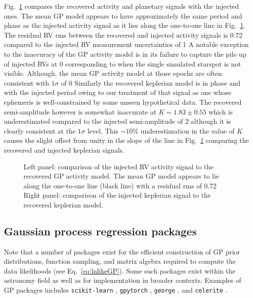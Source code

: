 Fig.~\ref{fig:RVcomp} compares the recovered activity and planetary signals with the injected
ones. The mean GP model appears to have approximately the same period and phase as the injected activity
signal as it lies along the one-to-one line in Fig.~\ref{fig:RVcomp}. The residual RV rms between the
recovered and injected activity signals is 0.72 \mps{} compared to the injected RV measurement uncertainties
of 1  A notable exception to the inaccuracy of the GP activity model is in its failure to
capture the pile up of injected RVs at 0 \mps{} corresponding to when the single simulated starspot is
not visible. Although, the mean GP activity model at those epochs are often consistent with $1\sigma$ of
0  Similarly the recovered keplerian model is in phase and with the injected period owing to our
treatment of that signal as one whose ephemeris is well-constrained by some unseen hypothetical data.
The recovered semi-amplitude however is somewhat inaccurate at $K=1.83 \pm 0.55$ \mps{} which is underestimated
compared to the injected semi-amplitude of 2 \mps{} although it is clearly consistent at the $1\sigma$ level.
This $\sim 10$\% underestimation in the value of $K$ causes the slight offset from unity in the slope
of the line in Fig.~\ref{fig:RVcomp} comparing the recovered and injected keplerian signals.

\begin{figure}
  \centering
  \caption[Comparison of injected to recovered RV signals.]
          {Left panel: comparison of the injected RV activity signal to the recovered GP activity model.
            The mean GP model appears to lie along the one-to-one line (black line) with a residual rms
            of 0.72  Right panel:
          comparison of the injected keplerian signal to the recovered keplerian model. }
  \label{fig:RVcomp}
\end{figure}


\subsection{Gaussian process regression packages}
Note that a number of packages exist for the efficient construction of GP prior distributions, function
sampling, and matrix algebra required to compute the data likelihoods (see Eq.~\ref{eq:lnlikeGP}).
Some such packages exist within the astronomy field as well as for implementation in broader contexts.
Examples of GP packages includes \texttt{scikit-learn} \citep{sklearn},
\texttt{gpytorch} \citep{gardner18,wang19},
\texttt{george} \citep{ambikasaran14,foremanmackey15b}, and
\texttt{celerite} \citep{foremanmackey17}.


